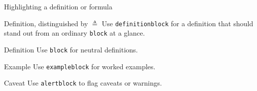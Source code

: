 %

\begin{standardframe}{Highlighting a definition or formula}
	\footnotesize
	\begin{definitionblock}{Definition, distinguished by $\triangleq$}
		Use \texttt{definitionblock} for a definition that should stand out
		from an ordinary \texttt{block} at a glance.
	\end{definitionblock}
	\begin{block}{Definition}
		Use \texttt{block} for neutral definitions.
	\end{block}
	\begin{exampleblock}{Example}
		Use \texttt{exampleblock} for worked examples.
	\end{exampleblock}
	\begin{alertblock}{Caveat}
		Use \texttt{alertblock} to flag caveats or warnings.
	\end{alertblock}
\end{standardframe}
